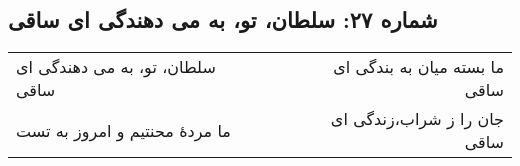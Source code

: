 \begin{center}
\section*{شماره ۲۷: سلطان، تو، به می دهندگی ای ساقی}
\label{sec:027}
\begin{longtable}{l p{0.5cm} r}
سلطان، تو، به می دهندگی ای ساقی
&&
ما بسته میان به بندگی ای ساقی
\\
ما مردهٔ محنتیم و امروز به تست
&&
جان را ز شراب،‌زندگی ای ساقی
\\
\end{longtable}
\end{center}
